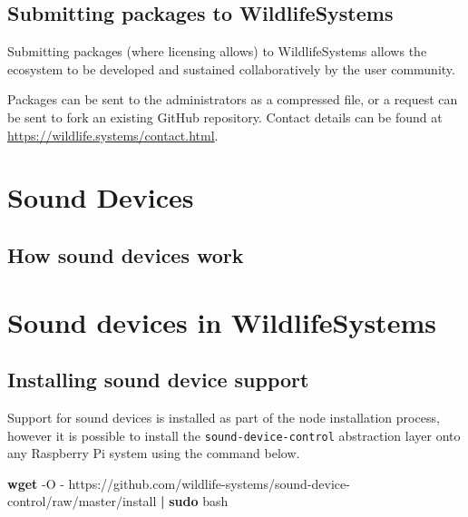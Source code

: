 \documentclass[
]{book}
\newenvironment{Shaded}{\begin{snugshade}}{\end{snugshade}}
\newcommand{\AttributeTok}[1]{\textcolor[rgb]{0.13,0.29,0.53}{#1}}
\newcommand{\FunctionTok}[1]{\textcolor[rgb]{0.13,0.29,0.53}{\textbf{#1}}}
\newcommand{\KeywordTok}[1]{\textcolor[rgb]{0.13,0.29,0.53}{\textbf{#1}}}
\newcommand{\NormalTok}[1]{#1}
\begin{document}
\section{Submitting packages to WildlifeSystems}\label{submitting-packages-to-wildlifesystems}

Submitting packages (where licensing allows) to WildlifeSystems allows the ecosystem to be developed and sustained collaboratively by the user community.

Packages can be sent to the administrators as a compressed file, or a request can be sent to fork an existing GitHub repository. Contact details can be found at \url{https://wildlife.systems/contact.html}.

\chapter{Sound Devices}\label{sound-devices}

\section{How sound devices work}\label{how-sound-devices-work}

\chapter{Sound devices in WildlifeSystems}\label{sound-devices-in-wildlifesystems}

\section{Installing sound device support}\label{installing-sound-device-support}

Support for sound devices is installed as part of the node installation process, however it is possible to install the \texttt{sound-device-control} abstraction layer onto any Raspberry Pi system using the command below.

\begin{Shaded}
\begin{Highlighting}[]
\KeywordTok{\textasciigrave{}}\FunctionTok{wget} \AttributeTok{{-}O} \AttributeTok{{-}}\NormalTok{ https://github.com/wildlife{-}systems/sound{-}device{-}control/raw/master/install }\KeywordTok{|} \FunctionTok{sudo}\NormalTok{ bash}\KeywordTok{\textasciigrave{}}
\end{Highlighting}
\end{Shaded}
\end{document}
